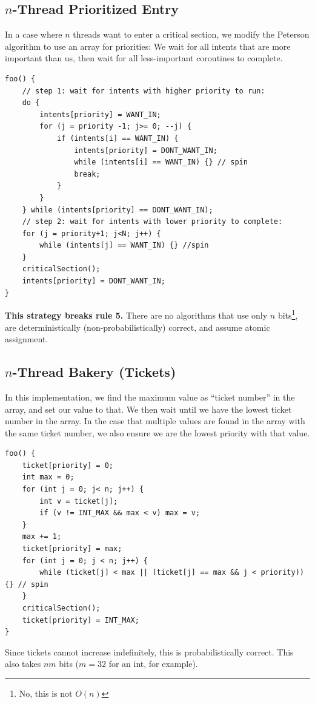             \subsection{$n$-Thread Prioritized Entry} %
            \label{sub:n_thread_prioritized_entry}
                In a case where $n$ threads want to enter a critical section, we modify the Peterson algorithm to use an array for priorities:
                We wait for all intents that are more important than us, then wait for all less-important coroutines to complete.
                \begin{lstlisting}
foo() {
    // step 1: wait for intents with higher priority to run:
    do {
        intents[priority] = WANT_IN;
        for (j = priority -1; j>= 0; --j) {
            if (intents[i] == WANT_IN) {
                intents[priority] = DONT_WANT_IN;
                while (intents[i] == WANT_IN) {} // spin
                break;
            }
        }
    } while (intents[priority] == DONT_WANT_IN);
    // step 2: wait for intents with lower priority to complete:
    for (j = priority+1; j<N; j++) {
        while (intents[j] == WANT_IN) {} //spin
    }
    criticalSection();
    intents[priority] = DONT_WANT_IN;
}
                \end{lstlisting}
                \textbf{This strategy breaks rule 5.}
                There are no algorithms that use only $n$ bits\footnote{No, this is not $O(n)$}, are deterministically (non-probabilistically) correct, and assume atomic assignment.
            \subsection{$n$-Thread Bakery (Tickets)} %
            \label{sub:n_thread_bakery_tickets}
                In this implementation, we find the maximum value as ``ticket number'' in the array, and set our value to that.
                We then wait until we have the lowest ticket number in the array.
                In the case that multiple values are found in the array with the same ticket number, we also ensure we are the lowest priority with that value.
                \begin{lstlisting}
foo() {
    ticket[priority] = 0;
    int max = 0;
    for (int j = 0; j< n; j++) {
        int v = ticket[j];
        if (v != INT_MAX && max < v) max = v;
    }
    max += 1;
    ticket[priority] = max;
    for (int j = 0; j < n; j++) {
        while (ticket[j] < max || (ticket[j] == max && j < priority)) {} // spin
    }
    criticalSection();
    ticket[priority] = INT_MAX;
}
                \end{lstlisting}
                Since tickets cannot increase indefinitely, this is probabilistically correct.
                This also takes $nm$ bits ($m = 32$ for an int, for example).
